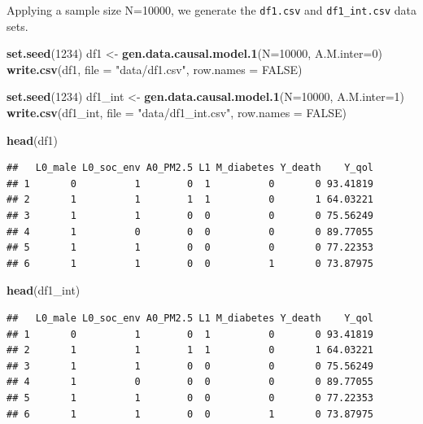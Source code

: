\documentclass[
]{book}
\newenvironment{Shaded}{\begin{snugshade}}{\end{snugshade}}
\newcommand{\AttributeTok}[1]{\textcolor[rgb]{0.13,0.29,0.53}{#1}}
\newcommand{\ConstantTok}[1]{\textcolor[rgb]{0.56,0.35,0.01}{#1}}
\newcommand{\DecValTok}[1]{\textcolor[rgb]{0.00,0.00,0.81}{#1}}
\newcommand{\FunctionTok}[1]{\textcolor[rgb]{0.13,0.29,0.53}{\textbf{#1}}}
\newcommand{\NormalTok}[1]{#1}
\newcommand{\OtherTok}[1]{\textcolor[rgb]{0.56,0.35,0.01}{#1}}
\newcommand{\StringTok}[1]{\textcolor[rgb]{0.31,0.60,0.02}{#1}}
\begin{document}
Applying a sample size N=10000, we generate the \texttt{df1.csv} and \texttt{df1\_int.csv} data sets.

\begin{Shaded}
\begin{Highlighting}[]
\FunctionTok{set.seed}\NormalTok{(}\DecValTok{1234}\NormalTok{)}
\NormalTok{df1 }\OtherTok{\textless{}{-}} \FunctionTok{gen.data.causal.model.1}\NormalTok{(}\AttributeTok{N=}\DecValTok{10000}\NormalTok{, }\AttributeTok{A.M.inter=}\DecValTok{0}\NormalTok{)}
\FunctionTok{write.csv}\NormalTok{(df1, }\AttributeTok{file =} \StringTok{"data/df1.csv"}\NormalTok{, }\AttributeTok{row.names =} \ConstantTok{FALSE}\NormalTok{)}

\FunctionTok{set.seed}\NormalTok{(}\DecValTok{1234}\NormalTok{)}
\NormalTok{df1\_int }\OtherTok{\textless{}{-}} \FunctionTok{gen.data.causal.model.1}\NormalTok{(}\AttributeTok{N=}\DecValTok{10000}\NormalTok{, }\AttributeTok{A.M.inter=}\DecValTok{1}\NormalTok{)}
\FunctionTok{write.csv}\NormalTok{(df1\_int, }\AttributeTok{file =} \StringTok{"data/df1\_int.csv"}\NormalTok{, }\AttributeTok{row.names =} \ConstantTok{FALSE}\NormalTok{)}
\end{Highlighting}
\end{Shaded}

\begin{Shaded}
\begin{Highlighting}[]
\FunctionTok{head}\NormalTok{(df1)}
\end{Highlighting}
\end{Shaded}

\begin{verbatim}
##   L0_male L0_soc_env A0_PM2.5 L1 M_diabetes Y_death    Y_qol
## 1       0          1        0  1          0       0 93.41819
## 2       1          1        1  1          0       1 64.03221
## 3       1          1        0  0          0       0 75.56249
## 4       1          0        0  0          0       0 89.77055
## 5       1          1        0  0          0       0 77.22353
## 6       1          1        0  0          1       0 73.87975
\end{verbatim}

\begin{Shaded}
\begin{Highlighting}[]
\FunctionTok{head}\NormalTok{(df1\_int)}
\end{Highlighting}
\end{Shaded}

\begin{verbatim}
##   L0_male L0_soc_env A0_PM2.5 L1 M_diabetes Y_death    Y_qol
## 1       0          1        0  1          0       0 93.41819
## 2       1          1        1  1          0       1 64.03221
## 3       1          1        0  0          0       0 75.56249
## 4       1          0        0  0          0       0 89.77055
## 5       1          1        0  0          0       0 77.22353
## 6       1          1        0  0          1       0 73.87975
\end{verbatim}
\end{document}
